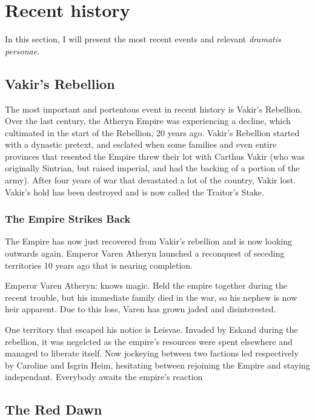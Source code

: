 \section{Recent history}

\label{recent_history}

In this section, I will present the most recent events and relevant \textit{dramatis personae}.

\subsection{Vakir's Rebellion}

The most important and portentous event in recent history is Vakir's Rebellion. Over the last century, the Atheryn Empire was experiencing a decline, which cultimated in the start of the Rebellion, 20 years ago. Vakir's Rebellion started with a dynastic pretext, and esclated when some families and even entire provinces that resented the Empire threw their lot with Carthus Vakir (who was originally Sintrian, but raised imperial, and had the backing of a portion of the army). After four years of war that devastated a lot of the country, Vakir lost. Vakir's hold has been destroyed and is now called the Traitor's Stake.


\subsubsection{The Empire Strikes Back}

The Empire has now just recovered from Vakir's rebellion and is now looking outwards again. Emperor Varen Atheryn launched a reconquest of seceding territories 10 years ago that is nearing completion.

Emperor Varen Atheryn: knows magic. Held the empire together during the recent trouble, but his immediate family died in the war, so his nephew is now heir apparent. Due to this loss, Varen has grown jaded and disinterested.

One territory that escaped his notice is Leisvae. Invaded by Eskand during the rebellion, it was negelcted as the empire's resources were spent elsewhere and managed to liberate itself. Now jockeying between two factions led respectively by Caroline and Isgrin Heim, hesitating between rejoining the Empire and staying independant. Everybody awaits the empire's reaction

\subsection{The Red Dawn}

